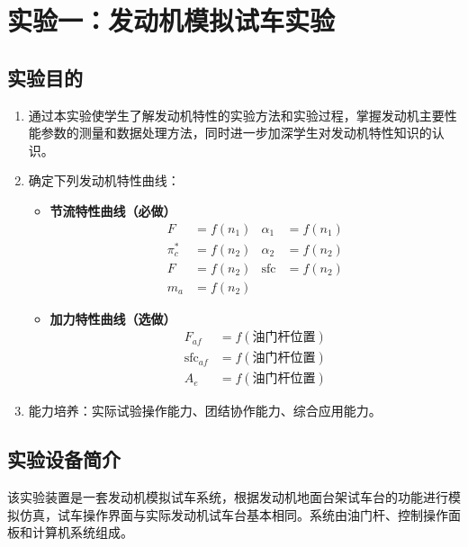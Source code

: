 \section{实验一：发动机模拟试车实验}

\subsection{实验目的}

\begin{enumerate}
    \item 通过本实验使学生了解发动机特性的实验方法和实验过程，掌握发动机主要性能参数的测量和数据处理方法，同时进一步加深学生对发动机特性知识的认识。
    \item 确定下列发动机特性曲线：
    \begin{itemize}
        \item \textbf{节流特性曲线（必做）}
        \begin{align*}
            F &= f(n_{1}) & \alpha_1 &= f(n_{1}) \\
            \pi_c^* &= f(n_{2}) & \alpha_2 &= f(n_{2}) \\
            F &= f(n_{2}) & \text{sfc} &= f(n_{2}) \\
            m_a &= f(n_{2})
        \end{align*}
        \item \textbf{加力特性曲线（选做）}
        \begin{align*}
            F_{af} &= f(\text{油门杆位置}) \\
            \text{sfc}_{af} &= f(\text{油门杆位置}) \\
            A_e &= f(\text{油门杆位置})
        \end{align*}
    \end{itemize}
    \item 能力培养：实际试验操作能力、团结协作能力、综合应用能力。
\end{enumerate}

\subsection{实验设备简介}

该实验装置是一套发动机模拟试车系统，根据发动机地面台架试车台的功能进行模拟仿真，试车操作界面与实际发动机试车台基本相同。系统由油门杆、控制操作面板和计算机系统组成。

